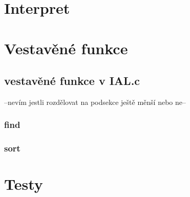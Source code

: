 \documentclass[a4paper,11pt]{article}
\begin{document}
\section{Interpret}

\section{Vestavěné funkce}
\subsection {vestavěné funkce v IAL.c}
--nevím jestli rozdělovat na podsekce ještě měnší nebo ne--
\subsubsection {find}
\subsubsection {sort}
\section{Testy}
\end{document}
